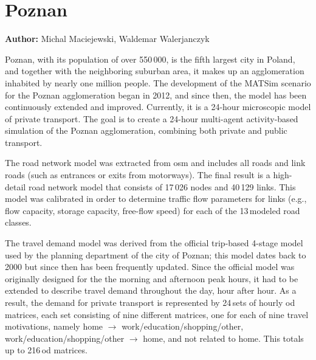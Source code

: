 \section{Poznan}
\label{sec:poznan}
\hfill \textbf{Author:} Michal Maciejewski, Waldemar Walerjanczyk


Poznan, with its population of over 550\,000, is the fifth largest city in Poland, and together with the neighboring suburban area, it makes up an agglomeration inhabited by nearly one million people. The development of the MATSim scenario for the Poznan agglomeration began in 2012, and since then, the model has been continuously extended and improved. Currently, it is a 24-hour microscopic model of private transport. The goal is to create a 24-hour multi-agent activity-based simulation of the Poznan agglomeration, combining both private and public transport.

The road network model was extracted from \gls{osm} and includes all roads and link roads (such as entrances or exits from motorways). The final result is a high-detail road network model that consists of 17\,026 nodes and 40\,129 links. This model was calibrated in order to determine traffic flow parameters for links (e.g.,\,flow capacity, storage capacity, free-flow speed) for each of the 13\,modeled road classes. 

The travel demand model was derived from the official trip-based 4-stage model used by the planning department of the city of Poznan; this model dates back to 2000 but since then has been frequently updated. Since the official model was originally designed for the the morning and afternoon peak hours, it had to be extended to describe travel demand throughout the day, hour after hour. As a result, the demand for private transport is represented by 24\,sets of hourly \gls{od} matrices, each set consisting of nine different matrices, one for each of nine travel motivations, namely home $\rightarrow$ work/education/shopping/other, work/education/shopping/other $\rightarrow$ home, and not related to home. This totals up to 216\,\gls{od} matrices. 

